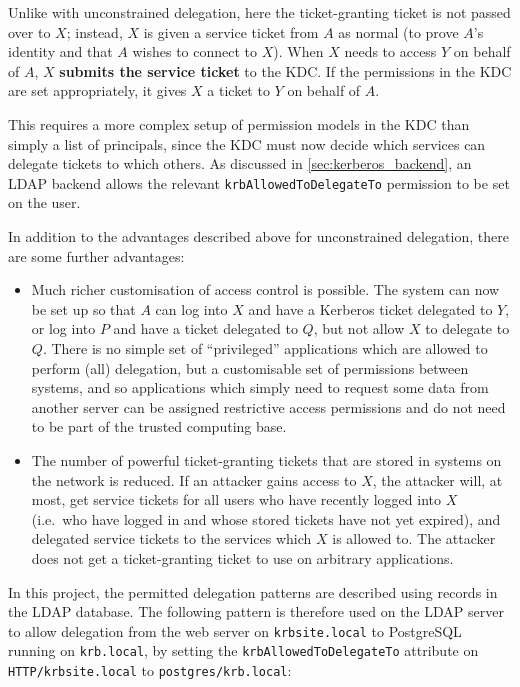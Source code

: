 \documentclass[12pt]{report}
\begin{document}
Unlike with unconstrained delegation, here the ticket-granting ticket is not passed over to $X$; instead, $X$ is given a service ticket from $A$ as normal (to prove $A$'s identity and that $A$ wishes to connect to $X$). When $X$ needs to access $Y$ on behalf of $A$, $X$ \textbf{submits the service ticket} to the KDC. If the permissions in the KDC are set appropriately, it gives $X$ a ticket to $Y$ on behalf of $A$.

This requires a more complex setup of permission models in the KDC than simply a list of principals, since the KDC must now decide which services can delegate tickets to which others. As discussed in \autoref{sec:kerberos_backend}, an LDAP backend allows the relevant \texttt{krbAllowedToDelegateTo} permission to be set on the user\cite{KRB-DELEG}.

In addition to the advantages described above for unconstrained delegation, there are some further advantages:

\begin{itemize}
\item
  Much richer customisation of access control is possible. The system can now be set up so that $A$ can log into $X$ and have a Kerberos ticket delegated to $Y$, or log into $P$ and have a ticket delegated to $Q$, but not allow $X$ to delegate to $Q$. There is no simple set of ``privileged'' applications which are allowed to perform (all) delegation, but a customisable set of permissions between systems, and so applications which simply need to request some data from another server can be assigned restrictive access permissions and do not need to be part of the trusted computing base.
\item
  The number of powerful ticket-granting tickets that are stored in systems on the network is reduced. If an attacker gains access to $X$, the attacker will, at most, get service tickets for all users who have recently logged into $X$ (i.e.\ who have logged in and whose stored tickets have not yet expired), and delegated service tickets to the services which $X$ is allowed to. The attacker does not get a ticket-granting ticket to use on arbitrary applications.
\end{itemize}

In this project, the permitted delegation patterns are described using records in the LDAP database. The following pattern is therefore used on the LDAP server to allow delegation from the web server on \verb+krbsite.local+ to PostgreSQL running on \verb+krb.local+, by setting the \texttt{krbAllowedToDelegateTo} attribute on \verb+HTTP/krbsite.local+ to \verb+postgres/krb.local+:
\end{document}
